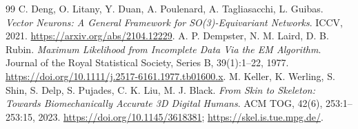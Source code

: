 \documentclass[UTF8,fontset=fandol,11pt,a4paper]{ctexart}
\theoremstyle{plain}
\theoremstyle{definition}
\theoremstyle{remark}
\numberwithin{equation}{section}
\begin{document}
\begin{thebibliography}{99}
 C. Deng, O. Litany, Y. Duan, A. Poulenard, A. Tagliasacchi, L. Guibas.
\emph{Vector Neurons: A General Framework for SO(3)-Equivariant Networks}. ICCV, 2021. \url{https://arxiv.org/abs/2104.12229}.
 A. P. Dempster, N. M. Laird, D. B. Rubin.
\emph{Maximum Likelihood from Incomplete Data Via the EM Algorithm}. Journal of the Royal Statistical Society, Series B, 39(1):1--22, 1977. \url{https://doi.org/10.1111/j.2517-6161.1977.tb01600.x}.
 M. Keller, K. Werling, S. Shin, S. Delp, S. Pujades, C. K. Liu, M. J. Black.
\emph{From Skin to Skeleton: Towards Biomechanically Accurate 3D Digital Humans}. ACM TOG, 42(6), 253:1--253:15, 2023. \url{https://doi.org/10.1145/3618381}; \url{https://skel.is.tue.mpg.de/}.
\end{thebibliography}
\end{document}
